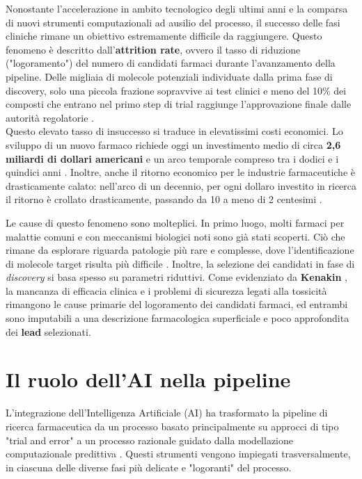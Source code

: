Nonostante l'accelerazione in ambito tecnologico degli ultimi anni e la comparsa di nuovi strumenti computazionali ad ausilio del processo, il successo delle fasi cliniche rimane un obiettivo estremamente difficile da raggiungere. Questo fenomeno è descritto dall'\textbf{attrition rate}, ovvero il tasso di riduzione ("logoramento") del numero di candidati farmaci durante l'avanzamento della pipeline.
Delle migliaia di molecole potenziali individuate dalla prima fase di discovery, solo una piccola frazione sopravvive ai test clinici e meno del 10\% dei composti che entrano nel primo step di trial raggiunge l'approvazione finale dalle autorità regolatorie \cite{zhangArtificialIntelligenceDrug2025}.\\
Questo elevato tasso di insuccesso si traduce in elevatissimi costi economici.
Lo sviluppo di un nuovo farmaco richiede oggi un investimento medio di circa 
\textbf{2,6 miliardi di dollari americani} e un arco temporale compreso tra 
i dodici e i quindici anni \cite{zhangArtificialIntelligenceDrug2025}. 
Inoltre, anche il ritorno economico per le industrie farmaceutiche 
è drasticamente calato: nell'arco di un decennio, per ogni dollaro 
investito in ricerca il ritorno è crollato drasticamente, passando da 10 a meno di 2 centesimi 
\cite{freedmanHuntingNewDrugs}.

Le cause di questo fenomeno sono molteplici. 
In primo luogo, molti farmaci per malattie comuni e con meccanismi biologici noti sono già stati scoperti. Ciò che rimane da 
esplorare riguarda patologie più rare e complesse, dove l'identificazione 
di molecole target risulta più difficile \cite{freedmanHuntingNewDrugs}. 
Inoltre, la selezione dei candidati in fase di \textit{discovery} si basa spesso su parametri riduttivi. Come evidenziato da \textbf{Kenakin} \cite{kenakinKnowYourMolecule2024}, la mancanza di efficacia clinica e i problemi di sicurezza legati alla tossicità rimangono le cause primarie del logoramento dei candidati farmaci, ed entrambi sono imputabili a una descrizione farmacologica superficiale e poco approfondita dei \textbf{lead} selezionati.

\section{Il ruolo dell'AI nella pipeline}
L'integrazione dell'Intelligenza Artificiale (AI)
ha trasformato la pipeline di ricerca farmaceutica da un processo basato principalmente su approcci di tipo "trial and error" a un processo razionale guidato dalla modellazione computazionale predittiva \cite{zhangArtificialIntelligenceDrug2025}.
Questi strumenti vengono impiegati trasversalmente, in ciascuna delle diverse fasi più delicate e "logoranti" del processo.

